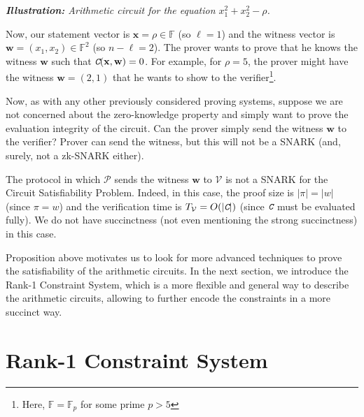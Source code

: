 \documentclass[../lecture-notes.tex]{subfiles}
\begin{document}
\begin{example}
\begin{center}

        \scriptsize \textit{\textbf{Illustration:} Arithmetic circuit for the equation $x_1^2 + x_2^2 - \rho$.}
    \end{center}

    Now, our statement vector is $\mathbf{x} = \rho \in \mathbb{F}$ (so $\ell=1$) and the witness vector is $\mathbf{w} = (x_1,x_2) \in \mathbb{F}^2$ (so $n-\ell=2$). The prover wants to prove that he knows the witness $\mathbf{w}$ such that $\textit{\texttt{C}}(\mathbf{x},\mathbf{w}) = 0$. For example, for $\rho=5$, the prover might have the witness $\mathbf{w} = (2,1)$ that he wants to show to the verifier\footnote{Here, $\mathbb{F} = \mathbb{F}_p$ for some prime $p > 5$}.
\end{example}

Now, as with any other previously considered proving systems, suppose we are not concerned about the zero-knowledge property and simply want to prove the evaluation integrity of the circuit. Can the prover simply send the witness $\mathbf{w}$ to the verifier? Prover can send the witness, but this will not be a SNARK (and, surely, not a zk-SNARK either). 

\begin{proposition}
    The protocol in which $\mathcal{P}$ sends the witness $\mathbf{w}$ to $\mathcal{V}$ is not a SNARK for the Circuit Satisfiability Problem. Indeed, in this case, the proof size is $|\pi| = |w|$ (since $\pi=w$) and the verification time is $T_{\mathcal{V}} = O(|\textit{\texttt{C}}|)$ (since $\textit{\texttt{C}}$ must be evaluated fully). We do not have succinctness (not even mentioning the strong succinctness) in this case.
\end{proposition}

Proposition above motivates us to look for more advanced techniques to prove the satisfiability of the arithmetic circuits. In the next section, we introduce the Rank-1 Constraint System, which is a more flexible and general way to describe the arithmetic circuits, allowing to further encode the constraints in a more succinct way.

\section{Rank-1 Constraint System}
\end{document}
